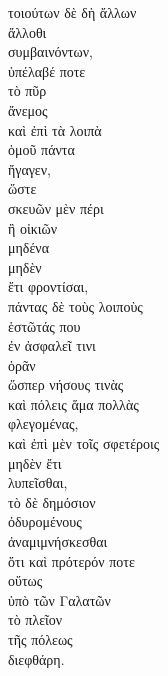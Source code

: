 

{\large
\begin{greek}
\noindent τοιούτων δὲ δὴ ἄλλων \\
\tabto{2em} ἄλλοθι \\
συμβαινόντων, \\
\tabto{2em} ὑπέλαβέ ποτε \\
\tabto{2em} τὸ πῦρ \\
\tabto{2em} ἄνεμος \\
\tabto{2em} καὶ ἐπὶ τὰ λοιπὰ \\
\tabto{4em} ὁμοῦ πάντα \\
\tabto{2em} ἤγαγεν, \\
\tabto{4em} ὥστε \\
\tabto{6em} σκευῶν μὲν πέρι \\
\tabto{8em} ἢ οἰκιῶν \\
\tabto{6em} μηδένα \\
\tabto{6em} μηδὲν \\
\tabto{6em} ἔτι φροντίσαι, \\
\tabto{6em} πάντας δὲ τοὺς λοιποὺς \\
\tabto{8em} ἑστῶτάς που \\
\tabto{10em} ἐν ἀσφαλεῖ τινι \\
\tabto{6em} ὁρᾶν \\
\tabto{8em} ὥσπερ νήσους τινὰς \\
\tabto{6em} καὶ πόλεις ἅμα πολλὰς \\
\tabto{8em} φλεγομένας, \\
\tabto{6em} καὶ ἐπὶ μὲν τοῖς σφετέροις \\
\tabto{8em} μηδὲν ἔτι \\
\tabto{6em} λυπεῖσθαι, \\
\tabto{6em} τὸ δὲ δημόσιον \\
\tabto{8em} ὀδυρομένους \\
\tabto{6em} ἀναμιμνήσκεσθαι \\
\tabto{8em} ὅτι καὶ πρότερόν ποτε \\
\tabto{10em} οὕτως \\
\tabto{12em} ὑπὸ τῶν Γαλατῶν \\
\tabto{10em} τὸ πλεῖον \\
\tabto{12em} τῆς πόλεως \\
\tabto{10em} διεφθάρη.\\

\end{greek}
}

